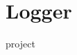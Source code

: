 \chapter{Logger}
\hypertarget{md__r_e_a_d_m_e}{}\label{md__r_e_a_d_m_e}
\label{md__r_e_a_d_m_e_autotoc_md0}%
%


 project 